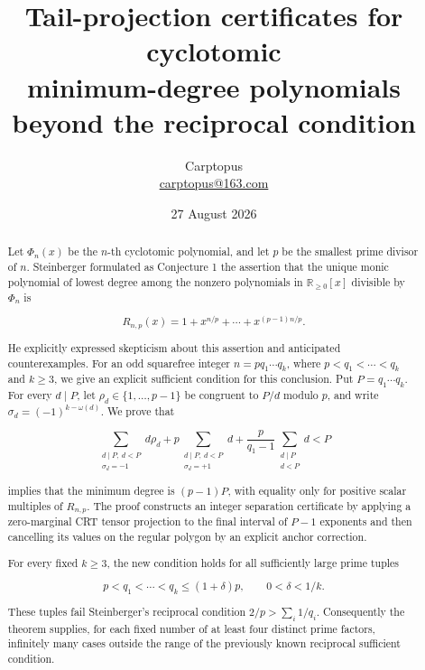 \documentclass[11pt]{article}
\title{Tail-projection certificates for cyclotomic\\
minimum-degree polynomials beyond the reciprocal condition}
\author{Carptopus\\\href{mailto:carptopus@163.com}{carptopus@163.com}}
\date{27 August 2026}
\numberwithin{equation}{section}
\begin{document}
\maketitle

\begin{center}
\end{center}

\begin{abstract}


Let \(\Phi_n(x)\) be the \(n\)-th cyclotomic polynomial, and let \(p\) be the
smallest prime divisor of \(n\). Steinberger formulated as Conjecture 1 the
assertion that the unique monic polynomial of lowest degree among the nonzero
polynomials in \(\mathbb R_{\geq0}[x]\) divisible by \(\Phi_n\) is

\nopagebreak[4]
\[
R_{n,p}(x)=1+x^{n/p}+\cdots+x^{(p-1)n/p}.
\]

He explicitly expressed skepticism about this assertion and anticipated
counterexamples. For an odd squarefree integer \(n=pq_1\cdots q_k\), where
\(p<q_1<\cdots<q_k\) and \(k\geq3\), we give an explicit sufficient
condition for this conclusion. Put \(P=q_1\cdots q_k\). For every \(d\mid P\),
let \(\rho_d\in\{1,\ldots,p-1\}\) be congruent to \(P/d\) modulo \(p\), and
write \(\sigma_d=(-1)^{k-\omega(d)}\). We prove that

\nopagebreak[4]
\[
\sum_{\substack{d\mid P,\ d<P\\ \sigma_d=-1}}d\rho_d
+p\sum_{\substack{d\mid P,\ d<P\\ \sigma_d=+1}}d
+\frac{p}{q_1-1}\sum_{\substack{d\mid P\\d<P}}d<P
\]

implies that the minimum degree is \((p-1)P\), with equality only for positive
scalar multiples of \(R_{n,p}\). The proof constructs an integer separation
certificate by applying a zero-marginal CRT tensor projection to the final
interval of \(P-1\) exponents and then cancelling its values on the regular
polygon by an explicit anchor correction.

For every fixed \(k\geq3\), the new condition holds for all sufficiently large
prime tuples

\nopagebreak[4]
\[
p<q_1<\cdots<q_k\leq(1+\delta)p,
\qquad 0<\delta<1/k.
\]

These tuples fail Steinberger's reciprocal condition
\(2/p>\sum_i1/q_i\). Consequently the theorem supplies, for each fixed number
of at least four distinct prime factors, infinitely many cases outside the
range of the previously known reciprocal sufficient condition.

\end{abstract}
\end{document}
